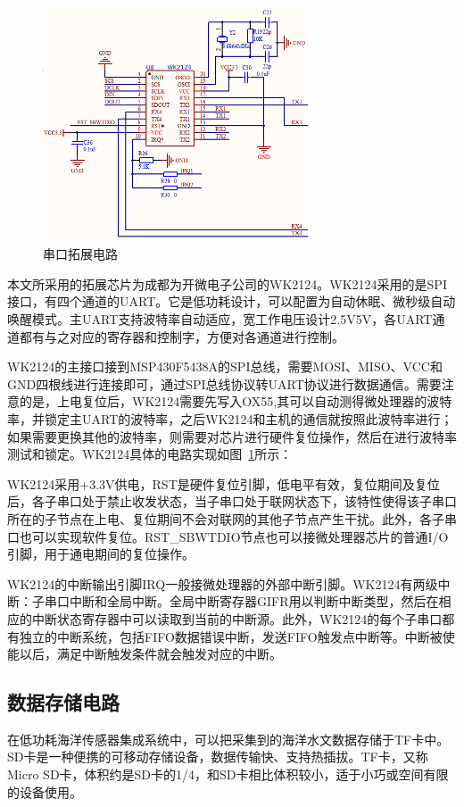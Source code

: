 \begin{figure}[ht]
    \centering
	\includegraphics[width=0.7\textwidth]{fig/wk2124.png}
	\caption{串口拓展电路}
	\label{fig:串口拓展电路}
\end{figure}

本文所采用的拓展芯片为成都为开微电子公司的WK2124。WK2124采用的是SPI接口，有四个通道的UART。它是低功耗设计，可以配置为自动休眠、微秒级自动唤醒模式。主UART支持波特率自动适应，宽工作电压设计2.5V\-5V，各UART通道都有与之对应的寄存器和控制字，方便对各通道进行控制。

WK2124的主接口接到MSP430F5438A的SPI总线，需要MOSI、MISO、VCC和GND四根线进行连接即可，通过SPI总线协议转UART协议进行数据通信。需要注意的是，上电复位后，WK2124需要先写入OX55,其可以自动测得微处理器的波特率，并锁定主UART的波特率，之后WK2124和主机的通信就按照此波特率进行；如果需要更换其他的波特率，则需要对芯片进行硬件复位操作，然后在进行波特率测试和锁定。WK2124具体的电路实现如图~\ref{fig:串口拓展电路}所示：

WK2124采用+3.3V供电，RST是硬件复位引脚，低电平有效，复位期间及复位后，各子串口处于禁止收发状态，当子串口处于联网状态下，该特性使得该子串口所在的子节点在上电、复位期间不会对联网的其他子节点产生干扰。此外，各子串口也可以实现软件复位。RST\_SBWTDIO节点也可以接微处理器芯片的普通I/O引脚，用于通电期间的复位操作。

WK2124的中断输出引脚IRQ一般接微处理器的外部中断引脚。WK2124有两级中断：子串口中断和全局中断。全局中断寄存器GIFR用以判断中断类型，然后在相应的中断状态寄存器中可以读取到当前的中断源。此外，WK2124的每个子串口都有独立的中断系统，包括FIFO数据错误中断，发送FIFO触发点中断等。中断被使能以后，满足中断触发条件就会触发对应的中断。

\subsection{数据存储电路}
在低功耗海洋传感器集成系统中，可以把采集到的海洋水文数据存储于TF卡中。SD卡是一种便携的可移动存储设备，数据传输快、支持热插拔。TF卡，又称Micro SD卡，体积约是SD卡的1/4，和SD卡相比体积较小，适于小巧或空间有限的设备使用。

